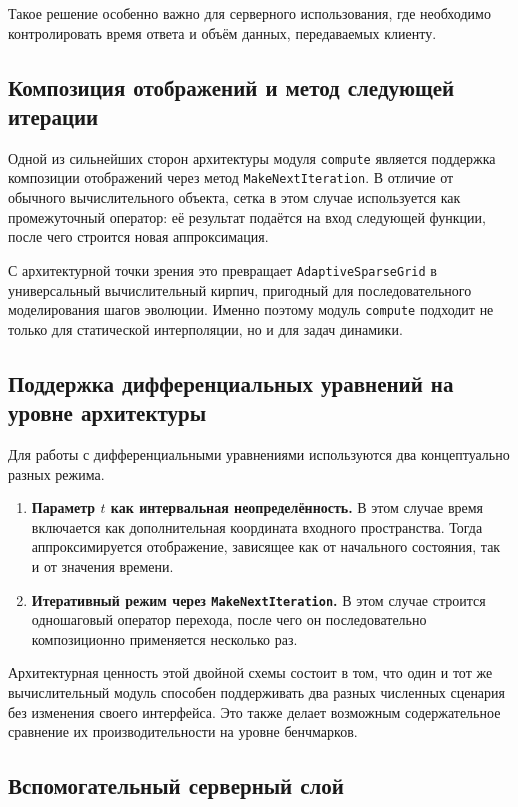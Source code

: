 Такое решение особенно важно для серверного использования, где необходимо контролировать время ответа и объём данных, передаваемых клиенту.

\subsection{Композиция отображений и метод следующей итерации}

Одной из сильнейших сторон архитектуры модуля \texttt{compute} является поддержка композиции отображений через метод \texttt{MakeNextIteration}. В отличие от обычного вычислительного объекта, сетка в этом случае используется как промежуточный оператор: её результат подаётся на вход следующей функции, после чего строится новая аппроксимация.

С архитектурной точки зрения это превращает \texttt{AdaptiveSparseGrid} в универсальный вычислительный кирпич, пригодный для последовательного моделирования шагов эволюции. Именно поэтому модуль \texttt{compute} подходит не только для статической интерполяции, но и для задач динамики.

\subsection{Поддержка дифференциальных уравнений на уровне архитектуры}

Для работы с дифференциальными уравнениями используются два концептуально разных режима.
\begin{enumerate}
    \item \textbf{Параметр $t$ как интервальная неопределённость.} В этом случае время включается как дополнительная координата входного пространства. Тогда аппроксимируется отображение, зависящее как от начального состояния, так и от значения времени.
    \item \textbf{Итеративный режим через \texttt{MakeNextIteration}.} В этом случае строится одношаговый оператор перехода, после чего он последовательно композиционно применяется несколько раз.
\end{enumerate}

Архитектурная ценность этой двойной схемы состоит в том, что один и тот же вычислительный модуль способен поддерживать два разных численных сценария без изменения своего интерфейса. Это также делает возможным содержательное сравнение их производительности на уровне бенчмарков.

\subsection{Вспомогательный серверный слой}

